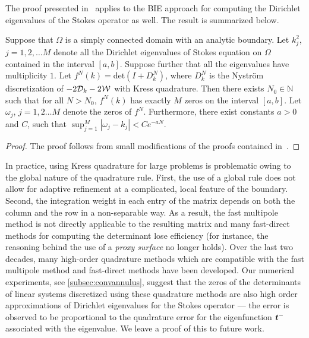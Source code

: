 The proof presented in~\cite{zhao2015robust} applies
to the BIE approach for computing the Dirichlet eigenvalues
of the Stokes operator as well.
The result is summarized below.
\begin{thrm}
\label{thm:mainconvfreddet}
Suppose that $\Omega$ is a simply connected
domain with an analytic boundary. Let $k_{j}^2$, $j=1,2,\ldots M$
denote all the Dirichlet eigenvalues of Stokes equation
on $\Omega$ contained in the interval $[a,b]$. 
Suppose further that all the eigenvalues have multiplicity $1$.
Let $f^{N}(k) = \text{det}(I+D^{N}_{k})$, where $D^{N}_{k}$ 
is the Nystr\"{o}m discretization of $-2{\mathcal D}_{k} - 2{\mathcal W}$ with Kress
quadrature.
Then there exists $N_{0} \in \mathbb{N}$ such
that for all $N>N_{0}$, 
$f^{N}(k)$ has exactly $M$ zeros on the interval $[a,b]$.
Let $\omega_{j}$, $j=1,2\ldots M$ denote the zeros of $f^{N}$.
Furthermore, there exist constants $a>0$ and $C$, 
such that $\sup_{j=1}^{M} |\omega_{j} - k_{j}| < C e^{-aN}$.
\end{thrm}

\begin{proof}
  The proof follows from small modifications of the
  proofs contained in~\cite{zhao2015robust}. 
\end{proof}

\begin{remark}
In practice, using Kress quadrature for large
problems is problematic owing to the global
nature of the quadrature rule.
%
First, the use of a global rule does not allow
for adaptive refinement at a complicated, local
feature of the boundary.
%
Second, the integration weight in each entry
of the matrix depends on both the column and the row
in a non-separable way.
%
As a result, the fast multipole method is not
directly applicable to the resulting matrix
and many fast-direct methods for computing
the determinant lose efficiency (for
instance, the reasoning behind the use of a
{\em proxy surface} \cite{cheng2005compression}
no longer holds).
Over the last two decades, many high-order quadrature
methods which are compatible with
the fast multipole method and fast-direct methods
have been developed.
%
Our numerical experiments, see \cref{subsec:convannulus},
suggest that the zeros of the 
determinants of linear systems discretized using 
these quadrature methods are also high order approximations
of Dirichlet eigenvalues for the Stokes operator ---
the error is observed to be proportional to the quadrature error
for the eigenfunction ${\boldsymbol t}^{-}$ associated with the eigenvalue.
We leave a proof of this to future work.
\end{remark}

